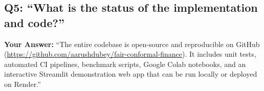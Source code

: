 \documentclass[11pt,a4paper]{article}
\begin{document}
\subsection*{Q5: ``What is the status of the implementation and code?''}
\textbf{Your Answer:}
``The entire codebase is open-source and reproducible on GitHub (\url{https://github.com/aarushdubey/fair-conformal-finance}). It includes unit tests, automated CI pipelines, benchmark scripts, Google Colab notebooks, and an interactive Streamlit demonstration web app that can be run locally or deployed on Render.''
\end{document}
